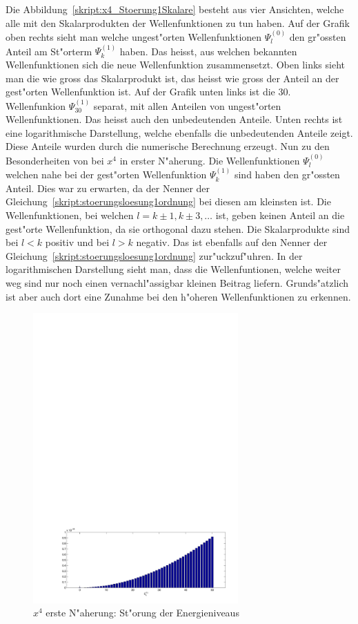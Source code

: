 \begin{refsection}
Die Abbildung~\ref{skript:x4_Stoerung1Skalare} besteht aus vier Ansichten,
welche alle mit den Skalarprodukten der Wellenfunktionen zu tun haben.
Auf der Grafik oben rechts sieht man welche ungest"orten
Wellenfunktionen $\Psi_l^{(0)}$ den gr"ossten Anteil am
St"orterm $\Psi_k^{(1)}$ haben.
Das heisst, aus welchen bekannten Wellenfunktionen sich die neue Wellenfunktion
zusammensetzt.
Oben links sieht man die wie gross das Skalarprodukt ist, das heisst wie gross der
Anteil an der gest"orten Wellenfunktion ist.
Auf der Grafik unten links ist die 30. Wellenfunkion $\Psi_{30}^{(1)}$ separat,
mit allen Anteilen von ungest"orten Wellenfunktionen.
Das heisst auch den unbedeutenden Anteile.
Unten rechts ist eine logarithmische Darstellung, welche ebenfalls die unbedeutenden
Anteile zeigt. Diese Anteile wurden durch die numerische Berechnung erzeugt.
Nun zu den Besonderheiten von bei $x^4$ in erster N"aherung.
Die Wellenfunktionen $\Psi_l^{(0)}$ welchen nahe bei der gest"orten Wellenfunktion
$\Psi_k^{(1)}$ sind haben den gr"ossten Anteil.
Dies war zu erwarten, da der Nenner der
Gleichung~\ref{skript:stoerungsloesung1ordnung} bei diesen am kleinsten ist.
Die Wellenfunktionen, bei welchen $l=k\pm 1,k\pm 3,\dots$ ist,
geben keinen Anteil an die gest"orte Wellenfunktion, da sie orthogonal dazu stehen.
Die Skalarprodukte sind bei $l<k$ positiv und bei $l>k$ negativ.
Das ist ebenfalls auf den Nenner der Gleichung~\ref{skript:stoerungsloesung1ordnung}
zur"uckzuf"uhren.
In der logarithmischen Darstellung sieht man, dass die Wellenfuntionen,
welche weiter weg sind nur noch einen vernachl"assigbar kleinen Beitrag liefern.
Grunds"atzlich ist aber auch dort eine Zunahme bei den h"oheren Wellenfunktionen
zu erkennen.

\begin{figure}	%
\centering
\includegraphics[width=0.7\textwidth]{anharmonisch/images/x4/EK1.pdf}
\caption{$x^4$ erste N"aherung: St"orung der Energieniveaus
\label{skript:x4_EK1}}
\end{figure}


\end{refsection}
